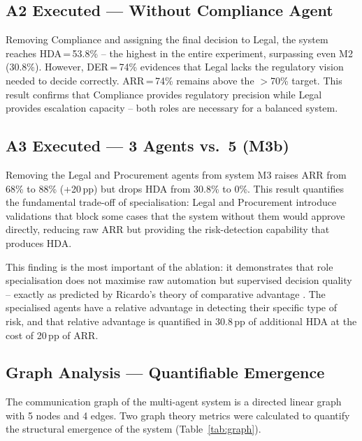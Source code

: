 \documentclass[preprint,12pt,authoryear]{elsarticle}
\begin{document}
\subsection{A2 Executed --- Without Compliance Agent}
\label{sec:a2}

Removing Compliance and assigning the final decision to Legal, the system
reaches HDA\,=\,53.8\% -- the highest in the entire experiment, surpassing
even M2 (30.8\%).
However, DER\,=\,74\% evidences that Legal lacks the regulatory vision needed
to decide correctly.
ARR\,=\,74\% remains above the $>$70\% target.
This result confirms that Compliance provides regulatory precision while Legal
provides escalation capacity -- both roles are necessary for a balanced system.

\subsection{A3 Executed --- 3 Agents vs.\ 5 (M3b)}

Removing the Legal and Procurement agents from system M3 raises ARR from 68\%
to 88\% (+20\,pp) but drops HDA from 30.8\% to 0\%.
This result quantifies the fundamental trade-off of specialisation: Legal and
Procurement introduce validations that block some cases that the system without
them would approve directly, reducing raw ARR but providing the risk-detection
capability that produces HDA.

This finding is the most important of the ablation: it demonstrates that role
specialisation does not maximise raw automation but supervised decision quality
-- exactly as predicted by Ricardo's theory of comparative advantage
\citep{ricardo1817}.
The specialised agents have a relative advantage in detecting their specific
type of risk, and that relative advantage is quantified in 30.8\,pp of
additional HDA at the cost of 20\,pp of ARR.

\subsection{Graph Analysis --- Quantifiable Emergence}

The communication graph of the multi-agent system is a directed linear graph
with 5 nodes and 4 edges.
Two graph theory metrics were calculated to quantify the structural emergence of
the system (Table~\ref{tab:graph}).
\end{document}
